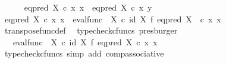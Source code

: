 \begin{isabellebody}
\ \ \ \ \isamarkupfalse%
\ {\isachardoublequoteopen}eq{\isacharunderscore}{\kern0pt}pred\ X\ {\isasymcirc}\isactrlsub c\ {\isasymlangle}x{\isacharcomma}{\kern0pt}\ x{\isasymrangle}\ {\isacharequal}{\kern0pt}\ eq{\isacharunderscore}{\kern0pt}pred\ X\ {\isasymcirc}\isactrlsub c\ {\isasymlangle}x{\isacharcomma}{\kern0pt}\ y{\isasymrangle}{\isachardoublequoteclose}\isanewline
\ \ \ \ \isamarkupfalse%
\ {\isacharminus}{\kern0pt}\ \isanewline
\ \ \ \ \ \ \isamarkupfalse%
\ {\isachardoublequoteopen}eq{\isacharunderscore}{\kern0pt}pred\ X\ {\isasymcirc}\isactrlsub c\ {\isasymlangle}x{\isacharcomma}{\kern0pt}\ x{\isasymrangle}\ {\isacharequal}{\kern0pt}\ {\isacharparenleft}{\kern0pt}{\isacharparenleft}{\kern0pt}eval{\isacharunderscore}{\kern0pt}func\ {\isasymOmega}\ X{\isacharparenright}{\kern0pt}\ {\isasymcirc}\isactrlsub c\ {\isacharparenleft}{\kern0pt}id\ X\ {\isasymtimes}\isactrlsub f\ {\isacharparenleft}{\kern0pt}eq{\isacharunderscore}{\kern0pt}pred\ X\isactrlsup {\isasymsharp}{\isacharparenright}{\kern0pt}{\isacharparenright}{\kern0pt}\ {\isacharparenright}{\kern0pt}\ {\isasymcirc}\isactrlsub c\ {\isasymlangle}x{\isacharcomma}{\kern0pt}\ x{\isasymrangle}{\isachardoublequoteclose}\isanewline
\ \ \ \ \ \ \ \ \isamarkupfalse%
\ transpose{\isacharunderscore}{\kern0pt}func{\isacharunderscore}{\kern0pt}def\ \isamarkupfalse%
\ {\isacharparenleft}{\kern0pt}typecheck{\isacharunderscore}{\kern0pt}cfuncs{\isacharcomma}{\kern0pt}\ presburger{\isacharparenright}{\kern0pt}\isanewline
\ \ \ \ \ \ \isamarkupfalse%
\ \isamarkupfalse%
\ {\isachardoublequoteopen}{\isachardot}{\kern0pt}{\isachardot}{\kern0pt}{\isachardot}{\kern0pt}\ {\isacharequal}{\kern0pt}\ {\isacharparenleft}{\kern0pt}eval{\isacharunderscore}{\kern0pt}func\ {\isasymOmega}\ X{\isacharparenright}{\kern0pt}\ {\isasymcirc}\isactrlsub c\ {\isacharparenleft}{\kern0pt}id\ X\ {\isasymtimes}\isactrlsub f\ {\isacharparenleft}{\kern0pt}eq{\isacharunderscore}{\kern0pt}pred\ X\isactrlsup {\isasymsharp}{\isacharparenright}{\kern0pt}{\isacharparenright}{\kern0pt}\ {\isasymcirc}\isactrlsub c\ {\isasymlangle}x{\isacharcomma}{\kern0pt}\ x{\isasymrangle}{\isachardoublequoteclose}\isanewline
\ \ \ \ \ \ \ \ \isamarkupfalse%
\ {\isacharparenleft}{\kern0pt}typecheck{\isacharunderscore}{\kern0pt}cfuncs{\isacharcomma}{\kern0pt}\ simp\ add{\isacharcolon}{\kern0pt}\ comp{\isacharunderscore}{\kern0pt}associative{}{\isacharparenright}{\kern0pt}\isanewline
\ \ \ \ \ \ \isamarkupfalse%

\end{isabellebody}
